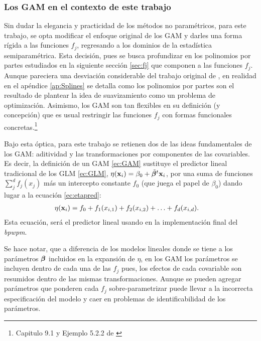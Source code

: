 \documentclass[../Main/Main.tex]{subfiles}
\begin{document}
\subsubsection*{Los GAM en el contexto de este trabajo}
Sin dudar la elegancia y practicidad de los métodos no paramétricos, para este trabajo, se opta modificar el enfoque original de los GAM y darles una forma rígida a las funciones $f_j$, regresando a los dominios de la estadística semiparamétrica. Esta decisión, pues se busca profundizar en los polinomios por partes estudiados en la siguiente sección \ref{sec:fj} que componen a las funciones $f_j$. Aunque pareciera una desviación considerable del trabajo original de \citeauthor{hastie1990generalized}, en realidad en el apéndice \ref{ap:Splines} se detalla como los polinomios por partes son el resultado de plantear la idea de suavizamiento como un problema de optimización. Asimismo, los GAM son tan flexibles en su definición (y concepción) que es usual restringir las funciones $f_j$ con formas funcionales concretas.\footnote{Capitulo 9.1 y Ejemplo 5.2.2 de \citet{hastie2008elements}}

Bajo esta óptica, para este trabajo se retienen dos de las ideas fundamentales de los GAM: aditividad y las transformaciones por componentes de las covariables. Es decir, la definición de un GAM \eqref{ec:GAM} sustituye el predictor lineal tradicional de los GLM \eqref{ec:GLM}, $\eta(\mathbf{x}_i) = \beta_0 + \tilde{\bm{\beta}}^t\mathbf{x}_i$, por una suma de funciones $\sum_j^d f_j(x_j)$ más un intercepto constante $f_0$ (que juega el papel de $\beta_0$) dando lugar a la ecuación \eqref{ec:etapred}:
\begin{align}
\eta(\mathbf{x}_i) &= f_0 + f_1(x_{i,1}) + f_2(x_{i,2}) + \ldots + f_d(x_{i,d}). \label{ec:etapred}
\end{align}
Esta ecuación, será el predictor lineal usando en la implementación final del \textit{bpwpm}. 

Se hace notar, que a diferencia de los modelos lineales donde se tiene a los parámetros $\bm{\beta}$ incluidos en la expansión de $\eta$, en los GAM los parámetros se incluyen dentro de cada una de las $f_j$ pues, los efectos de cada covariable son resumidos dentro de las mismas transformaciones. Aunque se pueden agregar parámetros que ponderen cada $f_j$ sobre-parametrizar puede llevar a la incorrecta especificación del modelo y caer en problemas de identificabilidad de los parámetros.
\end{document}
